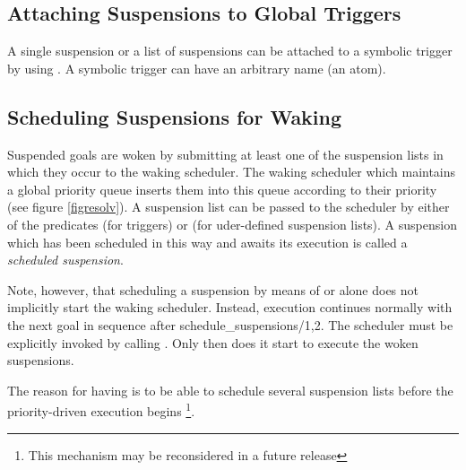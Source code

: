 \subsection{Attaching Suspensions to Global Triggers}
A single suspension or a list of suspensions can be attached to a
symbolic trigger by using
.
A symbolic trigger can have an arbitrary name (an atom).




\subsection{Scheduling Suspensions for Waking}
\label{secwaking}%
Suspended goals are woken by submitting at least one of the suspension lists
in which they occur to the waking scheduler.
The waking scheduler which maintains a global priority queue inserts
them into this queue according to their priority (see figure \ref{figresolv}).
A suspension list can be passed to the scheduler by either of the predicates
(for triggers)
or
(for uder-defined suspension lists).
A suspension which has been scheduled in this way and awaits
its execution is called a {\it scheduled suspension}.

Note, however, that scheduling a suspension by means of
or
alone does not implicitly start the waking scheduler.
Instead, execution continues normally with the next goal in sequence after
schedule_suspensions/1,2.
The scheduler must be explicitly invoked by calling 
.
Only then does it start to execute the woken suspensions.

The reason for having 
is to be able to schedule several suspension lists before the
priority-driven execution begins%
\footnote{This mechanism may be reconsidered in a future release}.

